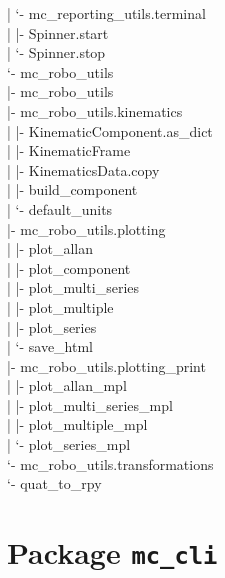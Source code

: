\documentclass[11pt]{article}
\begin{document}
\textcolor{TreeLevelTwo}{|  `- mc\_reporting\_utils.terminal}\\
\textcolor{TreeLevelThree}{|     |- Spinner.start}\\
\textcolor{TreeLevelThree}{|     `- Spinner.stop}\\
\textcolor{TreeLevelOne}{`- mc\_robo\_utils}\\
\textcolor{TreeLevelTwo}{   |- mc\_robo\_utils}\\
\textcolor{TreeLevelTwo}{   |- mc\_robo\_utils.kinematics}\\
\textcolor{TreeLevelThree}{   |  |- KinematicComponent.as\_dict}\\
\textcolor{TreeLevelThree}{   |  |- KinematicFrame}\\
\textcolor{TreeLevelThree}{   |  |- KinematicsData.copy}\\
\textcolor{TreeLevelThree}{   |  |- build\_component}\\
\textcolor{TreeLevelThree}{   |  `- default\_units}\\
\textcolor{TreeLevelTwo}{   |- mc\_robo\_utils.plotting}\\
\textcolor{TreeLevelThree}{   |  |- plot\_allan}\\
\textcolor{TreeLevelThree}{   |  |- plot\_component}\\
\textcolor{TreeLevelThree}{   |  |- plot\_multi\_series}\\
\textcolor{TreeLevelThree}{   |  |- plot\_multiple}\\
\textcolor{TreeLevelThree}{   |  |- plot\_series}\\
\textcolor{TreeLevelThree}{   |  `- save\_html}\\
\textcolor{TreeLevelTwo}{   |- mc\_robo\_utils.plotting\_print}\\
\textcolor{TreeLevelThree}{   |  |- plot\_allan\_mpl}\\
\textcolor{TreeLevelThree}{   |  |- plot\_multi\_series\_mpl}\\
\textcolor{TreeLevelThree}{   |  |- plot\_multiple\_mpl}\\
\textcolor{TreeLevelThree}{   |  `- plot\_series\_mpl}\\
\textcolor{TreeLevelTwo}{   `- mc\_robo\_utils.transformations}\\
\textcolor{TreeLevelThree}{      `- quat\_to\_rpy}\\
\endgroup

\section{Package \texttt{mc\_cli}}
\end{document}
